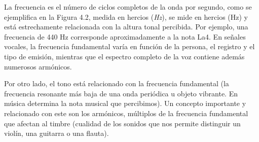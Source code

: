 La frecuencia es el número de ciclos completos de la onda por segundo, como se ejemplifica en la Figura 4.2, medida en hercios (\textit{Hz}), se mide en hercios (Hz) y está estrechamente relacionada con la altura tonal percibida. Por ejemplo, una frecuencia de 440 Hz corresponde aproximadamente a la nota La4. En señales vocales, la frecuencia fundamental varía en función de la persona, el registro y el tipo de emisión, mientras que el espectro completo de la voz contiene además numerosos armónicos.

Por otro lado, el tono está relacionado con la frecuencia fundamental (la frecuencia resonante más baja de una onda periódica u objeto vibrante. En música determina la nota musical que percibimos). 
Un concepto importante y relacionado con este son los armónicos, múltiplos de la frecuencia fundamental que afectan al timbre (cualidad de los sonidos que nos permite distinguir un violín, una guitarra o una flauta).